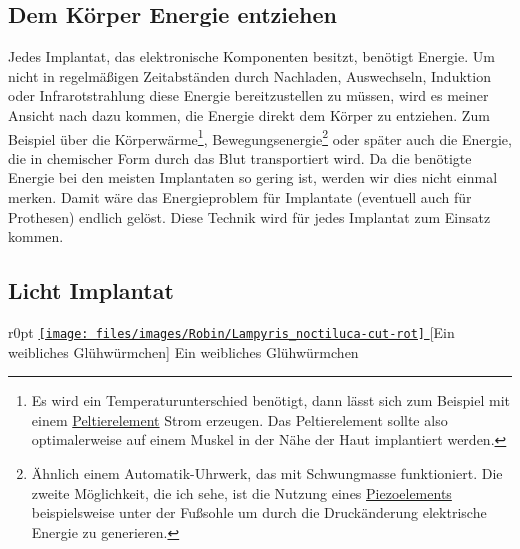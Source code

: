 \subsection{Dem Körper Energie entziehen}
Jedes Implantat, das elektronische Komponenten besitzt, benötigt Energie. Um nicht in regelmäßigen
Zeitabständen durch Nachladen, Auswechseln, Induktion oder Infrarotstrahlung diese Energie
bereitzustellen zu müssen, wird es meiner Ansicht nach dazu kommen, die Energie direkt dem Körper zu
entziehen. Zum Beispiel über die Körperwärme\footnote{Es wird ein Temperaturunterschied benötigt,
dann lässt sich zum Beispiel mit einem
\href{http://de.wikipedia.org/wiki/Peltier-Element}{Peltierelement} Strom erzeugen.
Das Peltierelement sollte also optimalerweise auf einem Muskel in der Nähe der Haut implantiert
werden.},
Bewegungsenergie\footnote{Ähnlich einem Automatik-Uhrwerk, das mit Schwungmasse funktioniert.
Die zweite Möglichkeit, die ich sehe, ist die Nutzung eines
\href{http://de.wikipedia.org/wiki/Piezoelement}{Piezoelements} beispielsweise unter der
Fußsohle um durch die Druckänderung elektrische Energie zu generieren.}%
oder später auch die Energie, die in chemischer Form
durch das Blut
transportiert wird. Da die benötigte Energie bei den meisten Implantaten so gering ist, werden wir
dies nicht einmal merken. Damit wäre das Energieproblem für Implantate (eventuell auch für Prothesen)
endlich gelöst.
Diese Technik wird für jedes Implantat zum Einsatz kommen.

\subsection{Licht Implantat}
\begin{wrapfigure}{r}{0pt}
	\href{http://de.wikipedia.org/w/index.php?title=Datei:Lampyris_noctiluca.jpg&filetimestamp=20050618231628}{%
		\texttt{[image: files/images/Robin/Lampyris\_noctiluca-cut-rot]}%
	}
	[Ein weibliches Glühwürmchen]%
		{Ein weibliches Glühwürmchen\footnotemark}%
	\label{fig:Firefly}
\end{wrapfigure}

